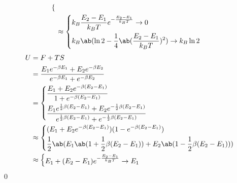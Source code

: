 \documentclass[uplatex,diffipdfmx,a4paper,11pt]{jlreq}
\makeatletter
\numberwithin{equation}{section}
\theoremstyle{definition}
\renewenvironment{proof}[1][\proofname]{\par
  \normalfont
  \topsep6\p@\@plus6\p@ \trivlist
  \item[\hskip\labelsep{\bfseries #1}\@addpunct{\bfseries}]\ignorespaces\quad\par
}{%
  \qed\endtrivlist\@endpefalse
}
\renewcommand\proofname{証明}
\makeatother
\begin{document}
\begin{proof}
\begin{align}
\begin{dcases}
    \end{dcases}                                                                                                                                                                                                                        \\
      & \approx
    \begin{dcases}
      k_B \frac{E_2 - E_1}{k_BT}e^{- \frac{E_2 - E_1}{k_BT}} \to 0          \\
      k_B\ab(\ln 2 - \frac{1}{4}\ab(\frac{E_2 - E_1}{k_BT})^2) \to k_B\ln 2 \\
    \end{dcases}
  \end{align}
  \begin{align}
    U & = F + TS                                                                                                                                                                                      \\
      & = \frac{E_1e^{-\beta E_1} + E_2e^{-\beta E_2}}{e^{-\beta E_1} + e^{-\beta E_2}}                                                                                                               \\
      & = \begin{dcases}
            \frac{E_1 + E_2e^{-\beta (E_2 - E_1)}}{1 + e^{-\beta (E_2 - E_1)}}                                                                                      \\
            \frac{E_1e^{\frac{1}{2}\beta (E_2 - E_1)} + E_2e^{-\frac{1}{2}\beta (E_2 - E_1)}}{e^{\frac{1}{2}\beta (E_2 - E_1)} + e^{-\frac{1}{2}\beta (E_2 - E_1)}} \\
          \end{dcases} \\
      & \approx \begin{dcases}
                  (E_1 + E_2e^{-\beta (E_2 - E_1)})(1 - e^{-\beta (E_2 - E_1)})                                       \\
                  \frac{1}{2}\ab(E_1\ab(1 + \frac{1}{2}\beta (E_2 - E_1)) + E_2\ab(1 - \frac{1}{2}\beta (E_2 - E_1))) \\
                \end{dcases}                                                                             \\
      & \approx \begin{dcases}
                  E_1 + (E_2 - E_1)e^{- \frac{E_2 - E_1}{k_BT}} \to E_1                                     \\

\end{dcases}
\end{align}
\end{proof}
\end{document}
